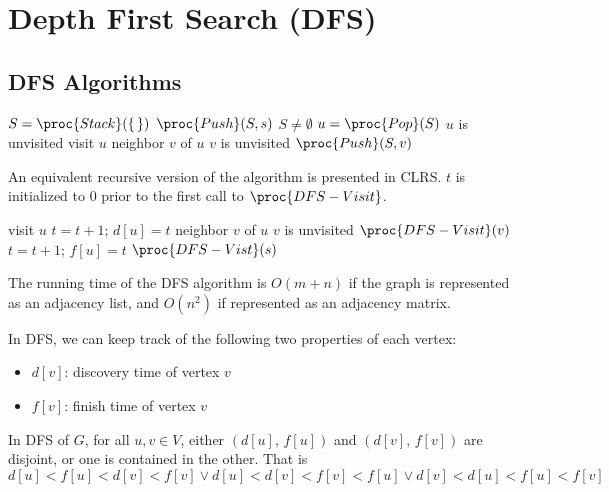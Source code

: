 \section{Depth First Search (DFS)}

\subsection{DFS Algorithms}

\begin{codebox}
    \li $S = \proc{Stack}(\{ \, \})$ 
    \li $\proc{Push}(S,s)$ 
    \li \While $S \neq \emptyset$ \Do
        \li $u = \proc{Pop}(S)$
        \li \If $u$ is unvisited \Then
            \li visit $u$
            \li {} neighbor $v$ of $u$ \Do
                \li \If $v$ is unvisited \Then
                    \li $\proc{Push}(S,v)$   
\end{codebox}

An equivalent recursive version of the algorithm is presented in CLRS. $t$ is initialized to 0 prior to the first call to $\proc{DFS-Visit}$.

\begin{codebox}
    \li visit $u$ 
    \li $t = t + 1$;\; $d[u] = t$ 
    \li {} neighbor $v$ of $u$ \Do
        \li \If $v$ is unvisited \Then
            \li $\proc{DFS-Visit}(v)$ 
            \End
        \End
    \li $t = t + 1$;\; $f[u] = t$
    \li $\proc{DFS-Vist}(s)$
\end{codebox}

The running time of the DFS algorithm is $O(m+n)$ if the graph is represented as an adjacency list, and $O(n^2)$ if represented as an adjacency matrix.

In DFS, we can keep track of the following two properties of each vertex:
\begin{itemize}
    \item $d[v]$: discovery time of vertex $v$ 
    \item $f[v]$: finish time of vertex $v$
\end{itemize}

\begin{theorem}
    In DFS of $G$, for all $u,v \in V$, either $(d[u],\, f[u])$ and $(d[v],\, f[v])$ are disjoint, or one is contained in the other. That is
    $$
    d[u] < f[u] < d[v] < f[v] \lor d[u] < d[v] < f[v] < f[u] \lor d[v] < d[u] < f[u] < f[v]
    $$
\end{theorem}

